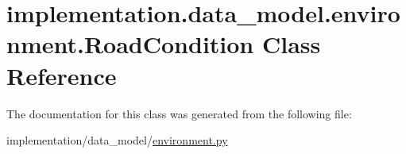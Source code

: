 \hypertarget{classimplementation_1_1data__model_1_1environment_1_1_road_condition}{}\section{implementation.\+data\+\_\+model.\+environment.\+Road\+Condition Class Reference}
\label{classimplementation_1_1data__model_1_1environment_1_1_road_condition}


The documentation for this class was generated from the following file\+:\begin{DoxyCompactItemize}
\item 
implementation/data\+\_\+model/\hyperlink{environment_8py}{environment.\+py}\end{DoxyCompactItemize}
